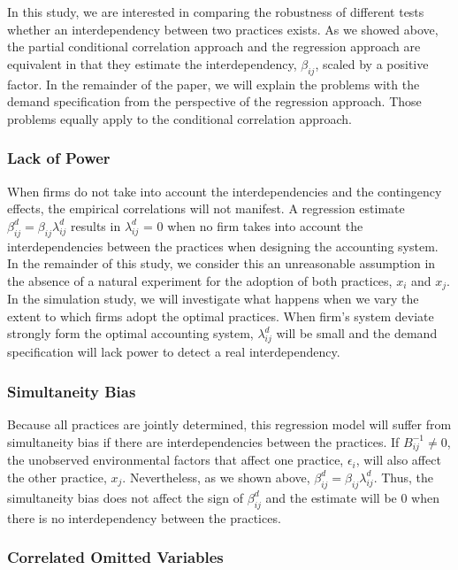 \documentclass[12pt]{article}
\begin{document}
In this study, we are interested in comparing the robustness of different tests whether an interdependency between two practices exists. As we showed above, the partial conditional correlation approach and the regression approach are equivalent in that they estimate the interdependency, $\beta_{ij}$, scaled by a positive factor. In the remainder of the paper, we will explain the problems with the demand specification from the perspective of the regression approach. Those problems equally apply to the conditional correlation approach.  

\subsubsection{Lack of Power}

When firms do not take into account the interdependencies and the contingency effects, the empirical correlations will not manifest. A regression estimate $\beta^d_{ij} = \beta_{ij} \lambda^d_{ij}$ results in $\lambda^d_{ij}$ = 0 when no firm takes into account the interdependencies between the practices when designing the accounting system. In the remainder of this study, we consider this an unreasonable  assumption in the absence of a natural experiment for the adoption of both practices, $x_i$ and $x_j$. In the simulation study, we will investigate what happens when we vary the extent to which firms adopt the optimal practices. When firm's system deviate strongly form the optimal accounting system, $\lambda^d_{ij}$ will be small and the demand specification will lack power to detect a real interdependency.

\subsubsection{Simultaneity Bias}

Because all practices are jointly determined, this regression model will suffer from simultaneity bias \citep{Chenhall2007} if there are interdependencies between the practices. If $B^{-1}_{ij} \neq 0$, the unobserved environmental factors that affect one practice, $\epsilon_i$, will also affect the other practice, $x_j$. Nevertheless, as we shown above, $\beta^d_{ij} = \beta_{ij} \lambda^d_{ij}$. Thus, the simultaneity bias does not affect the sign of $\beta^d_{ij}$ and the estimate will be 0 when there is no interdependency between the practices. 

\subsubsection{Correlated Omitted Variables}
\end{document}
